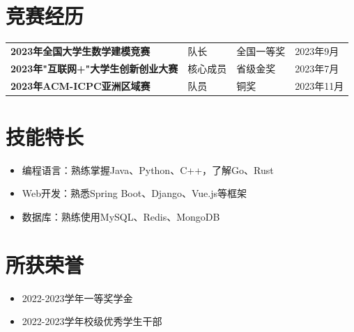 \section{\makebox[\widthof{\faTrophy}][c]{\color{BUPT_Blue}{\faTrophy}}\quad 竞赛经历}
\vspace{-1em}
\begin{table}[h!]
    \begin{tabularx}{\textwidth}{Xp{}p{}p{}}
        \textbf{2023年全国大学生数学建模竞赛} & 队长 & 全国一等奖 & 2023年9月 \\
        \textbf{2023年"互联网+"大学生创新创业大赛} & 核心成员 & 省级金奖 & 2023年7月\\
        \textbf{2023年ACM-ICPC亚洲区域赛} & 队员 & 铜奖 & 2023年11月\\
    \end{tabularx}
\end{table}

\section{\makebox[\widthof{\faWrench}][c]{\color{BUPT_Blue}{\faWrench}}\quad 技能特长}
\vspace{0.5em}
\begin{itemize}
    \item 编程语言：熟练掌握Java、Python、C++，了解Go、Rust
    \item Web开发：熟悉Spring Boot、Django、Vue.js等框架
    \item 数据库：熟练使用MySQL、Redis、MongoDB
\end{itemize}

\section{\makebox[\widthof{\faStar}][c]{\color{BUPT_Blue}{\faStar}}\quad 所获荣誉}
\vspace{-1em}
\begin{multicols}{2}
    \begin{itemize}
        \item 2022-2023学年一等奖学金
        \item 2022-2023学年校级优秀学生干部
    \end{itemize}
\end{multicols}


